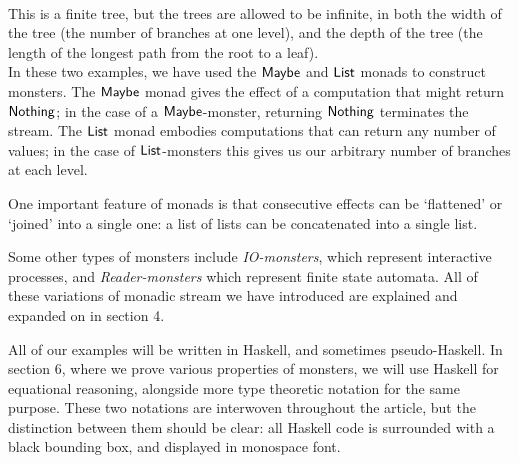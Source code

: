  \\

This is a finite tree, but the trees are allowed to be infinite, in both the width of the tree (the number of branches at one level), and the depth of the tree (the length of the longest path from the root to a leaf). \\

In these two examples, we have used the $\mathsf{Maybe}$ and $\mathsf{List}$ monads to construct monsters.
The $\mathsf{Maybe}$ monad gives the effect of a computation that might return $\mathsf{Nothing}$; in the case of a $\mathsf{Maybe}$-monster, returning $\mathsf{Nothing}$ terminates the stream. 
The $\mathsf{List}$ monad embodies computations that can return any number of values; in the case of $\mathsf{List}$-monsters this gives us our arbitrary number of branches at each level.

One important feature of monads is that consecutive effects can be `flattened' or `joined' into a single one: a list of lists can be concatenated into a single list. 





Some other types of monsters include \emph{IO-monsters}, which represent interactive processes, and \emph{Reader-monsters} which represent finite state automata. All of these variations of monadic stream we have introduced are explained and expanded on in section 4.

All of our examples will be written in Haskell, and sometimes pseudo-Haskell. In section 6, where we prove various properties of monsters, we will use Haskell for equational reasoning, alongside more type theoretic notation for the same purpose. These two notations are interwoven throughout the article, but the distinction between them should be clear: all Haskell code is surrounded with a black bounding box, and displayed in monospace font. \\

